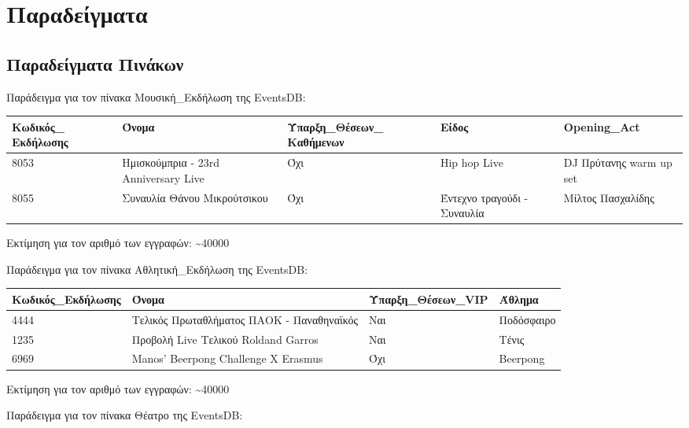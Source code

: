 ﻿\section{Παραδείγματα}

\subsection{Παραδείγματα Πινάκων}

Παράδειγμα για τον πίνακα Μουσική\_Εκδήλωση της EventsDB:

\begin{table}[H]
  \centering
  \footnotesize
\begin{tabular}[c]{|p{2cm}|p{2.5cm}|p{2.5cm}|p{2cm}|p{3.5cm}|}
  \hline
  Κωδικός\_ Εκδήλωσης & Όνομα                           & Ύπαρξη\_Θέσεων\_ Καθήμενων & Είδος                       & Opening\_Act            \\ \hline
  8053                & Ημισκούμπρια - 23rd Anniversary Live & Όχι                         & Hip hop Live                & DJ Πρύτανης warm up set \\ \hline
  8055                & Συναυλία Θάνου Μικρούτσικου     & Όχι                         & Έντεχνο τραγούδι - Συναυλία & Μίλτος Πασχαλίδης       \\ \hline
\end{tabular}
\end{table}

Εκτίμηση για τον αριθμό των εγγραφών: \textasciitilde 40000

Παράδειγμα για τον πίνακα Αθλητική\_Εκδήλωση της EventsDB:

\begin{table}[H]
  \centering
  \footnotesize
  \begin{tabular}{|p{3cm}|p{4cm}|p{3cm}|p{3cm}|}
  \hline
  Κωδικός\_Εκδήλωσης & Όνομα & Ύπαρξη\_Θέσεων\_VIP & Άθλημα \\ \hline
  4444 & Τελικός Πρωταθλήματος ΠΑΟΚ - Παναθηναϊκός & Ναι & Ποδόσφαιρο \\ \hline
  1235 & Προβολή Live Τελικού Roldand Garros & Ναι & Τένις \\ \hline
  6969 & Manos' Beerpong Challenge X Erasmus & Όχι & Beerpong \\ \hline
\end{tabular}
\end{table}
  
Εκτίμηση για τον αριθμό των εγγραφών: \textasciitilde 40000

Παράδειγμα για τον πίνακα Θέατρο της EventsDB:

